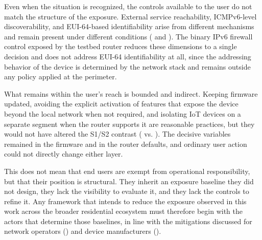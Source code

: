 Even when the situation is recognized, the controls available to the user do not match the structure of the exposure. External service reachability, ICMPv6-level discoverability, and EUI-64-based identifiability arise from different mechanisms and remain present under different conditions ( and ). The binary IPv6 firewall control exposed by the testbed router reduces these dimensions to a single decision and does not address EUI-64 identifiability at all, since the addressing behavior of the device is determined by the network stack and remains outside any policy applied at the perimeter.

What remains within the user's reach is bounded and indirect. Keeping firmware updated, avoiding the explicit activation of features that expose the device beyond the local network when not required, and isolating IoT devices on a separate segment when the router supports it are reasonable practices, but they would not have altered the S1/S2 contrast ( vs. ). The decisive variables remained in the firmware and in the router defaults, and ordinary user action could not directly change either layer.

This does not mean that end users are exempt from operational responsibility, but that their position is structural. They inherit an exposure baseline they did not design, they lack the visibility to evaluate it, and they lack the controls to refine it. Any framework that intends to reduce the exposure observed in this work across the broader residential ecosystem must therefore begin with the actors that determine those baselines, in line with the mitigations discussed for network operators () and device manufacturers ().